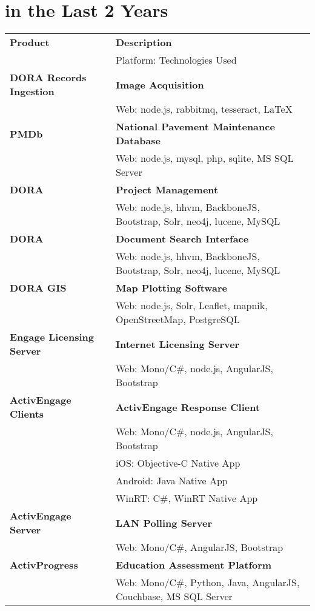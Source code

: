 \section{ in the Last 2 Years}
\noindent \begin{tabular}{ p{4cm} p{10.5cm} }
\textbf{Product} & \textbf{Description}\\
 & Platform: Technologies Used \\
\midrule
\textbf{DORA Records Ingestion} & \textbf{Image Acquisition}\\
 & Web: node.js, rabbitmq, tesseract, LaTeX\\
\midrule
\textbf{PMDb} & \textbf{National Pavement Maintenance Database}\\
 & Web: node.js, mysql, php, sqlite, MS SQL Server\\
\midrule
\textbf{DORA} & \textbf{Project Management}\\
 & Web: node.js, hhvm, BackboneJS, Bootstrap, Solr, neo4j, lucene, MySQL\\
\midrule
\textbf{DORA} & \textbf{Document Search Interface}\\
 & Web: node.js, hhvm, BackboneJS, Bootstrap, Solr, neo4j, lucene, MySQL\\
\midrule
\textbf{DORA GIS} & \textbf{Map Plotting Software}\\
 & Web: node.js, Solr, Leaflet, mapnik, OpenStreetMap, PostgreSQL\\
\midrule
\textbf{Engage Licensing Server} & \textbf{Internet Licensing Server} \\
 & Web: Mono/C\#, node.js, AngularJS, Bootstrap\\
\midrule
\textbf{ActivEngage Clients} & \textbf{ActivEngage Response Client}\\
 & Web: Mono/C\#, node.js, AngularJS, Bootstrap\\
 & iOS: Objective-C Native App\\
 & Android: Java Native App\\
 & WinRT: C\#, WinRT Native App\\
\midrule
\textbf{ActivEngage Server} & \textbf{LAN Polling Server}\\
 & Web: Mono/C\#, AngularJS, Bootstrap\\
\midrule
\textbf{ActivProgress} & \textbf{Education Assessment Platform}\\
 & Web: Mono/C\#, Python, Java, AngularJS, Couchbase, MS SQL Server\\

\end{tabular}
